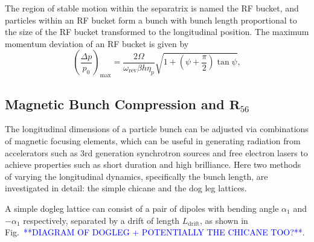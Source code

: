 \documentclass[../main.tex]{subfiles}
\begin{document}
The region of stable motion within the separatrix is named the RF bucket, and particles within an RF bucket form a bunch with bunch length proportional to the size of the RF bucket transformed to the longitudinal position. The maximum momentum deviation of an RF bucket is given by \cite{wolski2012longitudinal}
\begin{equation}
\left(\frac{\Delta p}{p_{0}}\right)_{\mathrm{max}} = \frac{2\Omega}{\omega_{\mathrm{rev}}\beta h\eta_{p}}\sqrt{1+\left(\psi+\frac{\pi}{2}\right)\tan\psi},
\label{eq:RF_bucket_momentum_deviation}    
\end{equation}

\subsection{Magnetic Bunch Compression and $\boldsymbol{R}_{56}$}

The longitudinal dimensions of a particle bunch can be adjusted via combinations of magnetic focusing elements, which can be useful in generating radiation from accelerators such as 3rd generation synchrotron sources and free electron lasers to achieve properties such as short duration and high brilliance. Here two methods of varying the longitudinal dynamics, specifically the bunch length, are investigated in detail: the simple chicane and the dog leg lattices.

A simple dogleg lattice can consist of a pair of dipoles with bending angle $\alpha_{1}$ and $-\alpha_{1}$ respectively, separated by a drift of length $L_{\mathrm{drift}}$, as shown in Fig.~\textcolor{blue}{**DIAGRAM OF DOGLEG + POTENTIALLY THE CHICANE TOO?**}.
\end{document}
